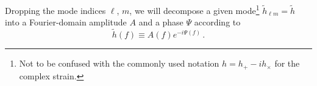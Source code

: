 \documentclass[aps,showpacs,twocolumn,
prd,superscriptaddress,nofootinbib]{revtex4-1}
\newcommand{\be}{\begin{equation}}
\newcommand{\ee}{\end{equation}}
\newcommand{\nn}{\nonumber}
\newcommand{\Hz}{\,\mathrm{Hz}}
\newcommand{\SM}[1]{{\color{Red} #1}}
\begin{document}
Dropping the mode indices $\ell$, $m$, we will decompose a given mode\footnote{Not to be confused with the commonly used notation $h = h_{+} - i h_{\times}$ for the complex strain.} $\tilde{h}_{\ell m} = \tilde{h}$ into a Fourier-domain amplitude $A$ and a phase $\Psi$ according to
\be\label{eq:defAPsi}
	\tilde{h}(f) \equiv A(f) e^{-i\Psi(f)} \,.
\ee
\end{document}
